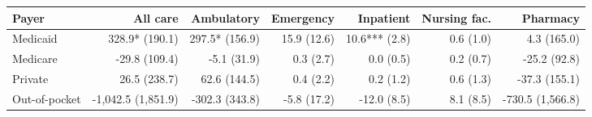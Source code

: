 \begin{tabular}{@{}l rrrrrr@{}}
\toprule
Payer & All care & Ambulatory & Emergency & Inpatient & Nursing fac. & Pharmacy \\
\midrule
Medicaid & 328.9* (190.1) & 297.5* (156.9) & 15.9 (12.6) & 10.6*** (2.8) & 0.6 (1.0) & 4.3 (165.0) \\
Medicare & -29.8 (109.4) & -5.1 (31.9) & 0.3 (2.7) & 0.0 (0.5) & 0.2 (0.7) & -25.2 (92.8) \\
Private & 26.5 (238.7) & 62.6 (144.5) & 0.4 (2.2) & 0.2 (1.2) & 0.6 (1.3) & -37.3 (155.1) \\
Out-of-pocket & -1,042.5 (1,851.9) & -302.3 (343.8) & -5.8 (17.2) & -12.0 (8.5) & 8.1 (8.5) & -730.5 (1,566.8) \\
\bottomrule
\end{tabular}
